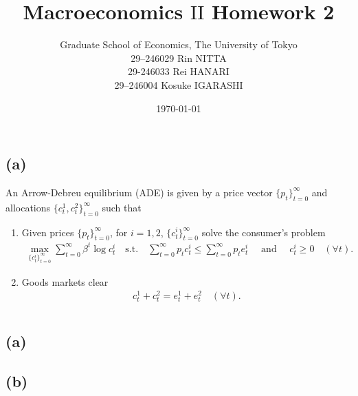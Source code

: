\documentclass{ltjsarticle}
\title{Macroeconomics $\mathrm{II}$ Homework 2}
\date{\today}
\author{Graduate School of Economics, The University of Tokyo\\[4mm]29--246029 Rin NITTA\\ 29-246033 Rei HANARI \\ 29--246004 Kosuke IGARASHI
}
\begin{document}
\maketitle



\section{} %

\subsection*{(a)}
An Arrow-Debreu equilibrium (ADE) is given by a price vector $\{p_t\}_{t=0}^\infty$ and allocations $\{c_t^1, c_t^2\}_{t=0}^\infty$ such that
\begin{enumerate}
    \item Given prices $\{p_t\}_{t=0}^\infty$, for $i = 1,2$, $\{c_t^i\}_{t=0}^\infty$ solve the consumer's problem
    \begin{gather*}
        \max_{\{c_t^i\}_{t=0}^\infty} \sum_{t=0}^\infty \beta^t \log c_t^i \quad \text{s.t.} \quad \sum_{t=0}^\infty p_t c_t^i \leq \sum_{t=0}^\infty p_t e_t^i \quad \text{ and } \quad c_t^i \geq 0 \quad ( \forall t).
    \end{gather*}
    \item Goods markets clear
    \begin{gather*}
        c_t^1 + c_t^2 = e_t^1 + e_t^2 \quad ( \forall t).
    \end{gather*}
\end{enumerate}

\section{} %

\subsection{(a)}

\subsection{(b)}

\section{} %

\section{} %

\section{} %

\section{} %
\end{document}

